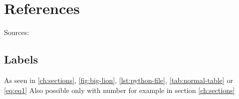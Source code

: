 \chapter{References}
\label{ch:references}
Sources: \cite{wb-ref}

\section{Labels}
As seen in \autoref{ch:sections}, \autoref{fig:big-lion}, \autoref{lst:python-file}, \autoref{tab:normal-table} or \autoref{eq:eq1}
\newline
Also possible only with number for example in section \ref{ch:sections}

